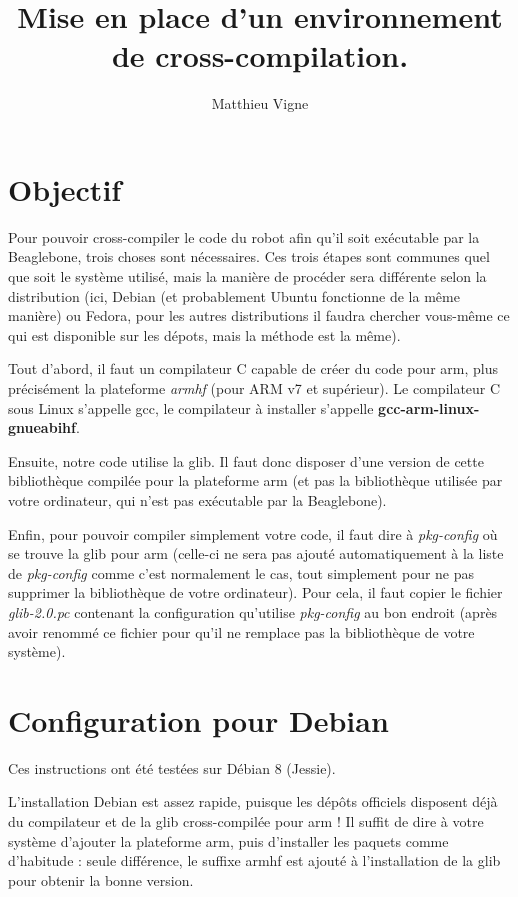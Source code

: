 \documentclass[a4paper,11pt]{article}
\title{Mise en place d'un environnement de cross-compilation.}
\author{Matthieu Vigne}
\begin{document}
\maketitle
\tableofcontents
\section{Objectif}
\indent \par Pour pouvoir cross-compiler le code du robot afin qu'il soit exécutable par la Beaglebone, trois choses sont nécessaires. Ces trois étapes sont communes quel que soit le système utilisé, mais la manière de procéder sera différente selon la distribution (ici, Debian (et probablement Ubuntu fonctionne de la même manière) ou Fedora,  pour les autres distributions il faudra chercher vous-même ce qui est disponible sur les dépots, mais la méthode est la même).
\par Tout d'abord, il faut un compilateur C capable de créer du code pour arm, plus précisément la plateforme \emph{armhf} (pour ARM v7 et supérieur). Le compilateur C sous Linux s’appelle gcc, le compilateur à installer s'appelle \textbf{gcc-arm-linux-gnueabihf}.
\par Ensuite, notre code utilise la glib. Il faut donc disposer d'une version de cette bibliothèque compilée pour la plateforme arm (et pas la bibliothèque utilisée par votre ordinateur, qui n'est pas exécutable par la Beaglebone).
\par Enfin, pour pouvoir compiler simplement votre code, il faut dire à \emph{pkg-config} où se trouve la glib pour arm (celle-ci ne sera pas ajouté automatiquement à la liste de \emph{pkg-config} comme c'est normalement le cas, tout simplement pour ne pas supprimer la bibliothèque de votre ordinateur). Pour cela, il faut copier le fichier \emph{glib-2.0.pc} contenant la configuration qu'utilise \emph{pkg-config} au bon endroit (après avoir renommé ce fichier pour qu'il ne remplace pas la bibliothèque de votre système).

\section{Configuration pour Debian}

\indent \par Ces instructions ont été testées sur Débian 8 (Jessie).

\par L'installation Debian est assez rapide, puisque les dépôts officiels disposent déjà du compilateur et de la glib cross-compilée pour arm ! Il suffit de dire à votre système d'ajouter la plateforme arm, puis d'installer les paquets comme d'habitude : seule différence, le suffixe armhf est ajouté à l'installation de la glib pour obtenir la bonne version.
\end{document}
